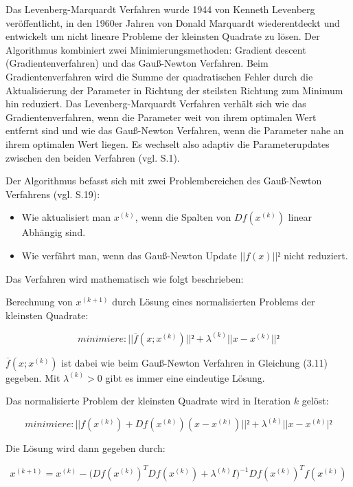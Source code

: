 Das Levenberg-Marquardt Verfahren wurde 1944 von Kenneth Levenberg \cite{levenberg} veröffentlicht, in den 1960er Jahren von Donald Marquardt wiederentdeckt und entwickelt um nicht lineare Probleme der kleinsten Quadrate zu lösen. Der Algorithmus kombiniert zwei Minimierungsmethoden: \glqq Gradient descent\grqq{} (Gradientenverfahren) und das Gauß-Newton Verfahren. Beim Gradientenverfahren wird die Summe der quadratischen Fehler durch die Aktualisierung der Parameter in Richtung der steilsten Richtung zum Minimum hin reduziert. Das Levenberg-Marquardt Verfahren verhält sich wie das Gradientenverfahren, wenn die Parameter weit von ihrem optimalen Wert entfernt sind und wie das Gauß-Newton Verfahren, wenn die Parameter nahe an ihrem optimalen Wert liegen. Es wechselt also adaptiv die Parameterupdates zwischen den beiden Verfahren (vgl. \cite{lev_mar} S.1).

Der Algorithmus befasst sich mit zwei Problembereichen des Gauß-Newton Verfahrens (vgl. \cite{nonlinear_1} S.19):

\begin{itemize}
\item Wie aktualisiert man $x^{(k)}$, wenn die Spalten von $Df(x^{(k)})$ linear Abhängig sind.

\item Wie verfährt man, wenn das Gauß-Newton Update $||f(x)||²$ nicht reduziert.
\end{itemize}

Das Verfahren wird mathematisch wie folgt beschrieben:

Berechnung von $x^{(k+1)}$ durch Lösung eines normalisierten Problems der kleinsten Quadrate:

\begin{equation}
minimiere: ||\overline{f}(x;x^{(k)})||² + \lambda^{(k)}||x-x^{(k)}||²
\end{equation}

$\overline{f}(x;x^{(k)})$ ist dabei wie beim Gauß-Newton Verfahren in Gleichung (3.11) gegeben. Mit $\lambda^{(k)} > 0$ gibt es immer eine eindeutige Lösung.

Das normalisierte Problem der kleinsten Quadrate wird in Iteration $k$ gelöst:

\begin{equation}
minimiere: ||f(x^{(k)}) + Df(x^{(k)})(x-x^{(k)})||² + \lambda^{(k)}||x-x^{(k)}|²
\end{equation}

Die Lösung wird dann gegeben durch:

\begin{equation}
x^{(k+1)} = x^{(k)} -\Big(Df(x^{(k)})^TDf(x^{(k)})+\lambda^{(k)}I\Big)^{-1} Df(x^{(k)})^T f(x^{(k)})
\end{equation}

